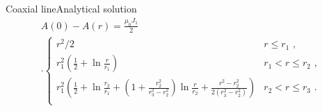 %
%
%
%
%

\begin{frame}{Coaxial line}{Analytical solution}
  \begin{multline*}
    A(0)-A(r) = \frac{\mu_0J_1}{2} \\ \cdot
    \begin{cases}
      r^2/2 & r \le r_1\text{~,} \\
      r_1^2\left(\frac{1}{2}+\ln\frac{r}{r_1}\right)
      & r_1 < r \le r_2\text{~,} \\
      r_1^2\left(\frac{1}{2}+\ln\frac{r_2}{r_1}
        +\left(1+\frac{r_2^2}{r_3^2-r_2^2}\right)\ln\frac{r}{r_2}
        +\frac{r^2-r_2^2}{2(r_3^2-r_2^2)}\right)
      & r_2 < r \le r_3\text{~.} \\
    \end{cases}
  \end{multline*}
  \vfill
  \centering
\end{frame}

